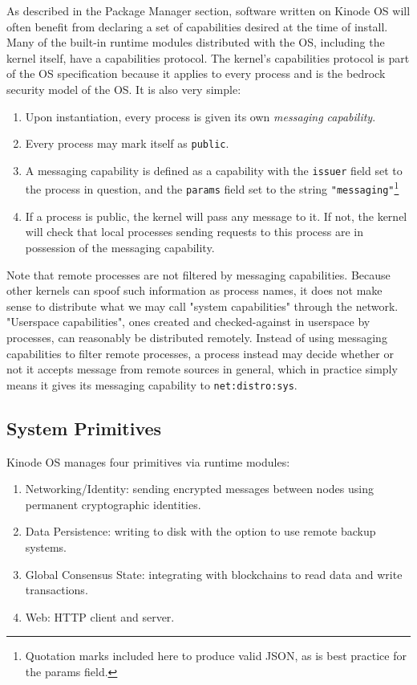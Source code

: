 \documentclass[runningheads]{llncs}
\begin{document}
As described in the Package Manager section, software written on Kinode OS will often benefit from declaring a set of capabilities desired at the time of install.
Many of the built-in runtime modules distributed with the OS, including the kernel itself, have a capabilities protocol.
The kernel's capabilities protocol is part of the OS specification because it applies to every process and is the bedrock security model of the OS.
It is also very simple:
\begin{enumerate}
    \item Upon instantiation, every process is given its own \textit{messaging capability}.
    \item Every process may mark itself as \verb|public|.
    \item A messaging capability is defined as a capability with the \verb|issuer| field set to the process in question, and the \verb|params| field set to the string \verb|"messaging"|\footnote{Quotation marks included here to produce valid JSON, as is best practice for the params field.}
    \item If a process is public, the kernel will pass any message to it. If not, the kernel will check that local processes sending requests to this process are in possession of the messaging capability.
\end{enumerate}

Note that remote processes are not filtered by messaging capabilities.
Because other kernels can spoof such information as process names, it does not make sense to distribute what we may call "system capabilities" through the network.
"Userspace capabilities", ones created and checked-against in userspace by processes, can reasonably be distributed remotely.
Instead of using messaging capabilities to filter remote processes, a process instead may decide whether or not it accepts message from remote sources in general, which in practice simply means it gives its messaging capability to \verb|net:distro:sys|.

\subsection{System Primitives}

Kinode OS manages four primitives via runtime modules:

\begin{enumerate}
    \item Networking/Identity: sending encrypted messages between nodes using permanent cryptographic identities.
    \item Data Persistence: writing to disk with the option to use remote backup systems.
    \item Global Consensus State: integrating with blockchains to read data and write transactions.
    \item Web: HTTP client and server.
\end{enumerate}
\end{document}
